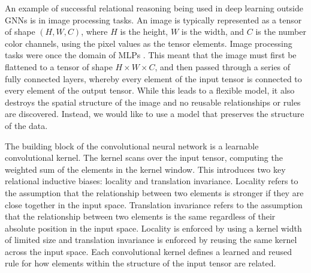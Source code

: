 


An example of successful relational reasoning being used in deep learning outside GNNs is in image processing tasks.
An image is typically represented as a tensor of shape $(H, W, C)$, where $H$ is the height, $W$ is the width, and $C$ is the number color channels, using the pixel values as the tensor elements.
Image processing tasks were once the domain of MLPs .
This meant that the image must first be flattened to a tensor of shape $H \times W \times C$, and then passed through a series of fully connected layers, whereby every element of the input tensor is connected to every element of the output tensor.
While this leads to a flexible model, it also destroys the spatial structure of the image and no reusable relationships or rules are discovered.
Instead, we would like to use a model that preserves the structure of the data.

The building block of the convolutional neural network is a learnable convolutional kernel.
The kernel scans over the input tensor, computing the weighted sum of the elements in the kernel window.
This introduces two key relational inductive biases: locality and translation invariance.
Locality refers to the assumption that the relationship between two elements is stronger if they are close together in the input space.
Translation invariance refers to the assumption that the relationship between two elements is the same regardless of their absolute position in the input space.
Locality is enforced by using a kernel width of limited size and translation invariance is enforced by reusing the same kernel across the input space.
Each convolutional kernel defines a learned and reused rule for how elements within the structure of the input tensor are related.

